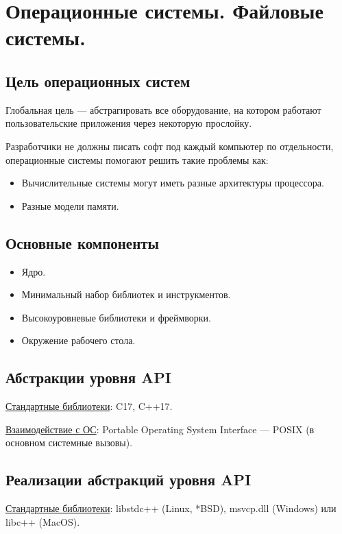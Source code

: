 \section{Операционные системы. Файловые системы.}

\subsection{Цель операционных систем}

Глобальная цель --- абстрагировать все оборудование, на котором работают
пользовательские приложения через некоторую прослойку.

Разработчики не должны писать софт под каждый компьютер по отдельности, 
операционные системы помогают решить такие проблемы как:
\begin{itemize}
	\item Вычислительные системы могут иметь разные архитектуры процессора.
	\item Разные модели памяти.
\end{itemize}

\subsection{Основные компоненты}

\begin{itemize}
	\item Ядро.
	\item Минимальный набор библиотек и инструкментов.
	\item Высокоуровневые библиотеки и фреймворки.
	\item Окружение рабочего стола.
\end{itemize}

\subsection{Абстракции уровня API}

\underline{Стандартные библиотеки}: C17, C++17.

\underline{Взаимодействие с ОС}: Portable Operating System Interface --- POSIX (в основном системные вызовы).

\subsection{Реализации абстракций уровня API}

\underline{Стандартные библиотеки}: libstdc++ (Linux, *BSD), msvcp.dll (Windows) 
или libc++ (MacOS).

